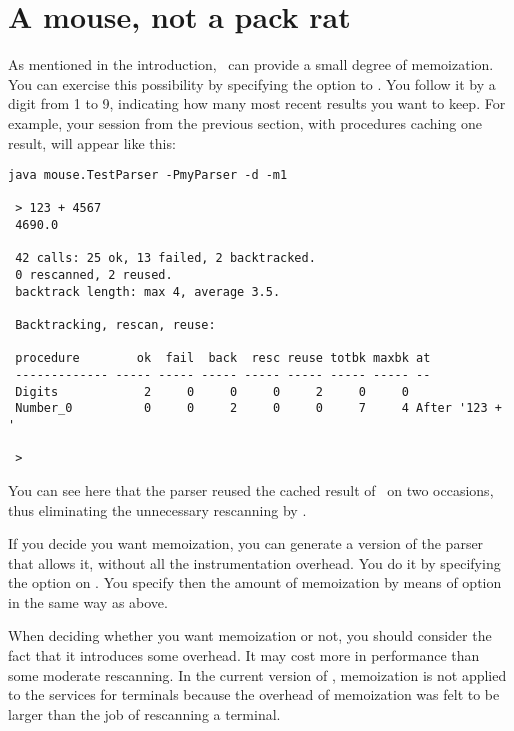 
\section{A mouse, not a pack rat\label{packrat}}


As mentioned in the introduction, \Mouse\ can provide a small degree of memoization.
You can exercise this possibility by specifying the option  
to . 
You follow it by a digit from 1 to 9, indicating how many most recent results
you want to keep.
For example, your session from the previous section, with procedures
caching one result, will appear like this: 

\small
\begin{Verbatim}[samepage=true,xleftmargin=15mm,baselinestretch=0.8]
 java mouse.TestParser -PmyParser -d -m1

 > 123 + 4567   
 4690.0

 42 calls: 25 ok, 13 failed, 2 backtracked.
 0 rescanned, 2 reused.
 backtrack length: max 4, average 3.5.

 Backtracking, rescan, reuse:

 procedure        ok  fail  back  resc reuse totbk maxbk at             
 ------------- ----- ----- ----- ----- ----- ----- ----- --             
 Digits            2     0     0     0     2     0     0
 Number_0          0     0     2     0     0     7     4 After '123 + ' 

 >
\end{Verbatim}

\normalsize
You can see here that the parser reused the cached result
of \Digits\ on two occasions, thus eliminating the unnecessary rescanning by \tx{[0-9]}.

\medskip
If you decide you want memoization, you can generate a version of the parser
that allows it, without all the instrumentation overhead.
You do it by specifying the option  on .
You specify then the amount of memoization by means of  option
in the same way as above.

When deciding whether you want memoization or not, you should consider 
the fact that it introduces some overhead.
It may cost more in performance than some moderate rescanning.
In the current version of \Mouse,
memoization is not applied 
to the services for terminals 
because the overhead of memoization was felt to be larger
than the job of rescanning a terminal.
